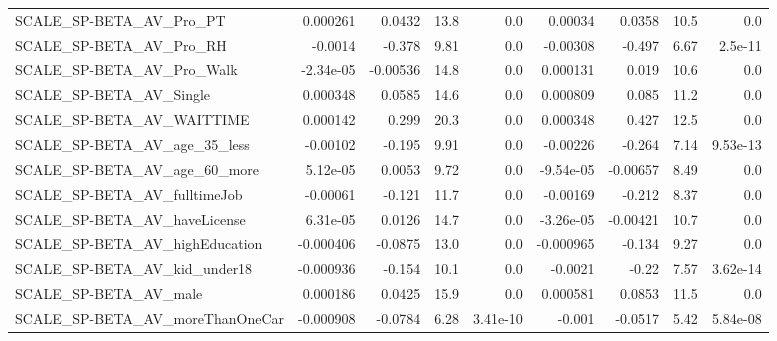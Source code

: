 \begin{tabular}{lrrrrrrrr}
SCALE\_SP-BETA\_AV\_Pro\_PT                            &    0.000261 &       0.0432 &      13.8 &      0.0 &    0.00034 &      0.0358 &         10.5 &           0.0 \\
SCALE\_SP-BETA\_AV\_Pro\_RH                            &     -0.0014 &       -0.378 &      9.81 &      0.0 &   -0.00308 &      -0.497 &         6.67 &       2.5e-11 \\
SCALE\_SP-BETA\_AV\_Pro\_Walk                          &   -2.34e-05 &     -0.00536 &      14.8 &      0.0 &   0.000131 &       0.019 &         10.6 &           0.0 \\
SCALE\_SP-BETA\_AV\_Single                            &    0.000348 &       0.0585 &      14.6 &      0.0 &   0.000809 &       0.085 &         11.2 &           0.0 \\
SCALE\_SP-BETA\_AV\_WAITTIME                          &    0.000142 &        0.299 &      20.3 &      0.0 &   0.000348 &       0.427 &         12.5 &           0.0 \\
SCALE\_SP-BETA\_AV\_age\_35\_less                       &    -0.00102 &       -0.195 &      9.91 &      0.0 &   -0.00226 &      -0.264 &         7.14 &      9.53e-13 \\
SCALE\_SP-BETA\_AV\_age\_60\_more                       &    5.12e-05 &       0.0053 &      9.72 &      0.0 &  -9.54e-05 &    -0.00657 &         8.49 &           0.0 \\
SCALE\_SP-BETA\_AV\_fulltimeJob                       &    -0.00061 &       -0.121 &      11.7 &      0.0 &   -0.00169 &      -0.212 &         8.37 &           0.0 \\
SCALE\_SP-BETA\_AV\_haveLicense                       &    6.31e-05 &       0.0126 &      14.7 &      0.0 &  -3.26e-05 &    -0.00421 &         10.7 &           0.0 \\
SCALE\_SP-BETA\_AV\_highEducation                     &   -0.000406 &      -0.0875 &      13.0 &      0.0 &  -0.000965 &      -0.134 &         9.27 &           0.0 \\
SCALE\_SP-BETA\_AV\_kid\_under18                       &   -0.000936 &       -0.154 &      10.1 &      0.0 &    -0.0021 &       -0.22 &         7.57 &      3.62e-14 \\
SCALE\_SP-BETA\_AV\_male                              &    0.000186 &       0.0425 &      15.9 &      0.0 &   0.000581 &      0.0853 &         11.5 &           0.0 \\
SCALE\_SP-BETA\_AV\_moreThanOneCar                    &   -0.000908 &      -0.0784 &      6.28 & 3.41e-10 &     -0.001 &     -0.0517 &         5.42 &      5.84e-08 \\

\end{tabular}
